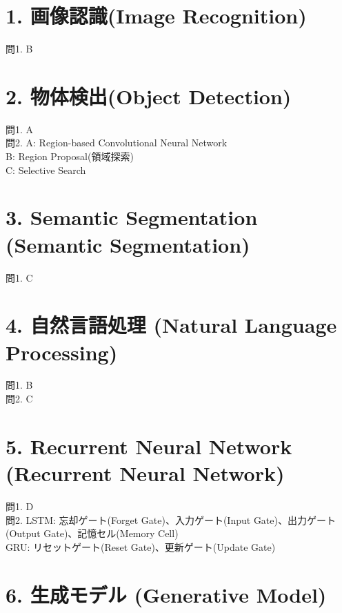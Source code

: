 \documentclass[
  letterpaper,
  DIV=11,
  numbers=noendperiod]{scrreprt}
\begin{document}
\section{1. 画像認識(Image
Recognition)}\label{ux753bux50cfux8a8dux8b58image-recognition-1}

問1. B

\section{2. 物体検出(Object
Detection)}\label{ux7269ux4f53ux691cux51faobject-detection-1}

問1. A\\
問2. A: Region-based Convolutional Neural Network\\
B: Region Proposal(領域探索)\\
C: Selective Search

\section{3. Semantic Segmentation (Semantic
Segmentation)}\label{semantic-segmentation-semantic-segmentation-1}

問1. C

\section{4. 自然言語処理 (Natural Language
Processing)}\label{ux81eaux7136ux8a00ux8a9eux51e6ux7406-natural-language-processing-1}

問1. B\\
問2. C

\section{5. Recurrent Neural Network (Recurrent Neural
Network)}\label{recurrent-neural-network-recurrent-neural-network-1}

問1. D\\
問2. LSTM: 忘却ゲート(Forget Gate)、入力ゲート(Input
Gate)、出力ゲート(Output Gate)、記憶セル(Memory Cell)\\
GRU: リセットゲート(Reset Gate)、更新ゲート(Update Gate)

\section{6. 生成モデル (Generative
Model)}\label{ux751fux6210ux30e2ux30c7ux30eb-generative-model-1}
\end{document}
